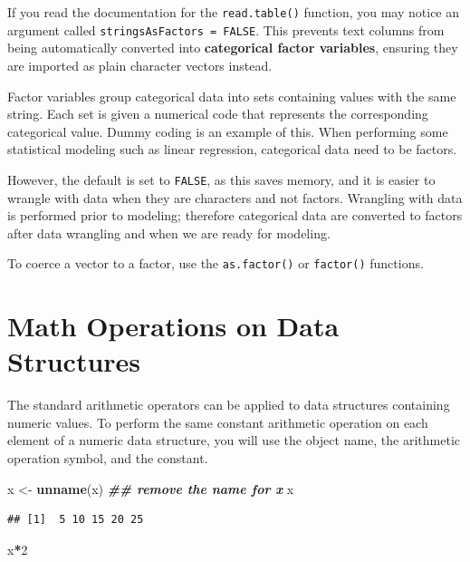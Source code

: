 \documentclass[
]{book}
\newenvironment{Shaded}{\begin{snugshade}}{\end{snugshade}}
\newcommand{\DecValTok}[1]{\textcolor[rgb]{0.00,0.00,0.81}{#1}}
\newcommand{\DocumentationTok}[1]{\textcolor[rgb]{0.56,0.35,0.01}{\textbf{\textit{#1}}}}
\newcommand{\FunctionTok}[1]{\textcolor[rgb]{0.13,0.29,0.53}{\textbf{#1}}}
\newcommand{\NormalTok}[1]{#1}
\newcommand{\OtherTok}[1]{\textcolor[rgb]{0.56,0.35,0.01}{#1}}
\newcommand{\SpecialCharTok}[1]{\textcolor[rgb]{0.81,0.36,0.00}{\textbf{#1}}}
\theoremstyle{definition}
\theoremstyle{definition}
\theoremstyle{definition}
\theoremstyle{definition}
\theoremstyle{remark}
\begin{document}
If you read the documentation for the \texttt{read.table()} function, you may notice an argument called \texttt{stringsAsFactors\ =\ FALSE}. This prevents text columns from being automatically converted into \textbf{categorical factor variables}, ensuring they are imported as plain character vectors instead.

Factor variables group categorical data into sets containing values with the same string. Each set is given a numerical code that represents the corresponding categorical value. Dummy coding is an example of this. When performing some statistical modeling such as linear regression, categorical data need to be factors.

However, the default is set to \texttt{FALSE}, as this saves memory, and it is easier to wrangle with data when they are characters and not factors. Wrangling with data is performed prior to modeling; therefore categorical data are converted to factors after data wrangling and when we are ready for modeling.

To coerce a vector to a factor, use the \texttt{as.factor()} or \texttt{factor()} functions.

\hypertarget{mathops}{%
\section{Math Operations on Data Structures}\label{mathops}}

The standard arithmetic operators can be applied to data structures containing numeric values. To perform the same constant arithmetic operation on each element of a numeric data structure, you will use the object name, the arithmetic operation symbol, and the constant.

\begin{Shaded}
\begin{Highlighting}[]
\NormalTok{x }\OtherTok{\textless{}{-}} \FunctionTok{unname}\NormalTok{(x) }\DocumentationTok{\#\# remove the name for x}
\NormalTok{x}
\end{Highlighting}
\end{Shaded}

\begin{verbatim}
## [1]  5 10 15 20 25
\end{verbatim}

\begin{Shaded}
\begin{Highlighting}[]
\NormalTok{x}\SpecialCharTok{*}\DecValTok{2}
\end{Highlighting}
\end{Shaded}
\end{document}
